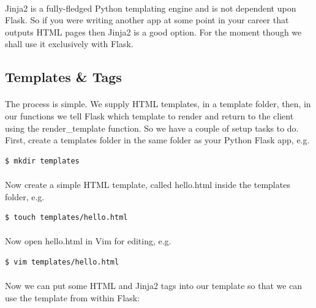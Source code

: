 \documentclass[12pt, a4paper, oneside]{book}
\begin{document}
{\paragraph{} Jinja2 is a fully-fledged Python templating engine and is not dependent upon Flask. So if you were writing another app at some point in your career that outputs HTML pages then Jinja2 is a good option. For the moment though we shall use it exclusively with Flask.


\subsection{Templates \& Tags}
\label{templates-tags}
\paragraph{} The process is simple. We supply HTML templates, in a template folder, then, in our functions we tell Flask which template to render and return to the client using the render\_template function. So we have a couple of setup tasks to do. First, create a templates folder in the same folder as your Python Flask app, e.g.

\begin{lstlisting}[style=DOS]
$ mkdir templates
\end{lstlisting}

\paragraph{} Now create a simple HTML template, called hello.html inside the templates folder, e.g.
\begin{lstlisting}[style=DOS]
$ touch templates/hello.html
\end{lstlisting}

\paragraph{} Now open hello.html in Vim for editing, e.g.
\begin{lstlisting}[style=DOS]
$ vim templates/hello.html
\end{lstlisting}

\paragraph{} Now we can put some HTML and Jinja2 tags into our template so that we can use the template from within Flask:


}
\end{document}
